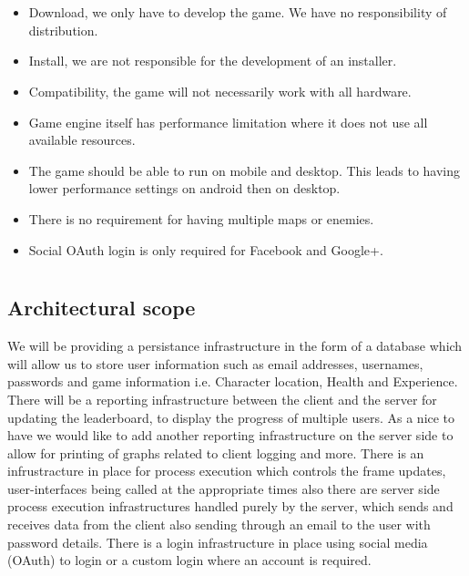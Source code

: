 \documentclass[letterpaper]{article}
\begin{document}
		\section*{\colorbox{black}{}} 
		\vspace{0.2in}
		
		\begin{itemize}
  		\item Download, we only have to develop the game. We have no responsibility of distribution.
  		\item Install, we are not responsible for the development of an installer.
  		\item Compatibility, the game will not necessarily work with all hardware.
  		\item Game engine itself has performance limitation where it does not use all available resources.
  		\item The game should be able to run on mobile and desktop. This leads to having lower performance settings on android then on desktop.
  		\item There is no requirement for having multiple maps or enemies.
  		\item Social OAuth login is only required for Facebook and Google+.
		\end{itemize}
		
		\section*{\colorbox{black}{}} 
		\vspace{0.1in}
			
			\subsection*{ Architectural scope }
			\vspace{0.1in}	
			We will be providing a persistance infrastructure in the form of a database which will allow us to store user information such as email addresses, usernames, passwords and game information i.e. Character location, Health and Experience. There will be a reporting infrastructure between the client and the server for updating the leaderboard, to display the progress of multiple users. As a nice to have we would like to add another reporting infrastructure on the server side to allow for printing of graphs related to client logging and more. There is an infrustracture in place for process execution which controls the frame updates, user-interfaces being called at the appropriate times also there are server side process execution infrastructures handled purely by the server, which sends and receives data from the client also sending through an email to the user with password details. There is a login infrastructure in place using social media (OAuth) to login or a custom login where an account is required. 
				
\end{document}
